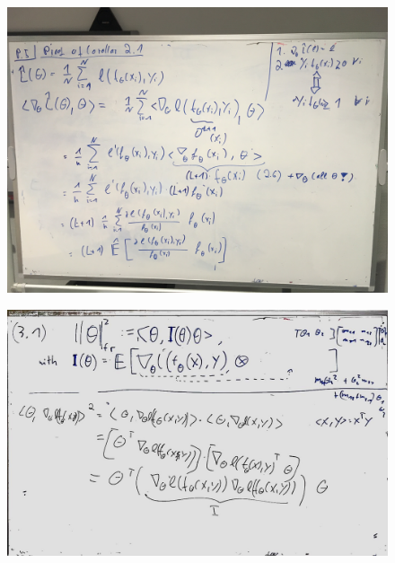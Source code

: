 \documentclass[a4paper]{article}
\begin{document}
\begin{figure}[htb]
	\centering
\includegraphics[width=\textwidth]{whiteboard_notes/IMG_1583.jpg}
\end{figure}
\begin{figure}[htb]
	\centering
\includegraphics[width=\textwidth]{whiteboard_notes/3_1_proof.jpg}
\end{figure}
\end{document}
